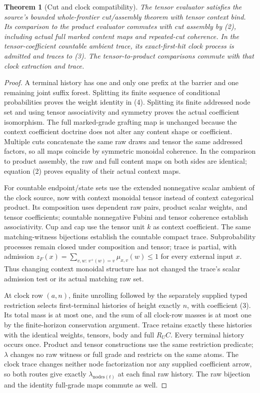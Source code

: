 \documentclass[11pt]{article}
\newtheorem{theorem}{Theorem}\newtheorem{proposition}[theorem]{Proposition}
\begin{document}
\begin{theorem}[Cut and clock compatibility]
The tensor evaluator satisfies the source's bounded whole-frontier cut/assembly theorem with tensor context bind. Its comparison to the product evaluator commutes with cut assembly by (2), including actual full marked content maps and repeated-cut coherence. In the tensor-coefficient countable ambient trace, its exact-first-hit clock process is admitted and traces to (3). The tensor-to-product comparisons commute with that clock extraction and trace.
\end{theorem}
\begin{proof}
A terminal history has one and only one prefix at the barrier and one remaining joint suffix forest. Splitting its finite sequence of conditional probabilities proves the weight identity in (4). Splitting its finite addressed node set and using tensor associativity and symmetry proves the actual coefficient isomorphism. The full marked-grade grafting map is unchanged because the context coefficient doctrine does not alter any content shape or coefficient. Multiple cuts concatenate the same raw draws and tensor the same addressed factors, so all maps coincide by symmetric monoidal coherence. In the comparison to product assembly, the raw and full content maps on both sides are identical; equation (2) proves equality of their actual context maps.

For countable endpoint/state sets use the extended nonnegative scalar ambient of the clock source, now with context monoidal tensor instead of context categorical product. Its composition uses dependent raw pairs, product scalar weights, and tensor coefficients; countable nonnegative Fubini and tensor coherence establish associativity. Cup and cap use the tensor unit $k$ as context coefficient. The same matching-witness bijections establish the countable compact trace. Subprobability processes remain closed under composition and tensor; trace is partial, with admission $z_F(x)=\sum_{v,w:\,v^+(w)=v}\mu_{x,v}(w)\leq1$ for every external input $x$. Thus changing context monoidal structure has not changed the trace's scalar admission test or its actual matching raw set.

At clock row $(a,n)$, finite unrolling followed by the separately supplied typed restriction selects first-terminal histories of height exactly $n$, with coefficient (3). Its total mass is at most one, and the sum of all clock-row masses is at most one by the finite-horizon conservation argument. Trace retains exactly these histories with the identical weights, tensors, body and full $R_UC$. Every terminal history occurs once. Product and tensor constructions use the same restriction predicate; $\lambda$ changes no raw witness or full grade and restricts on the same atoms. The clock trace changes neither node factorization nor any supplied coefficient arrow, so both routes give exactly $\lambda_{\mathrm{nodes}(t)}$ at each final raw history. The raw bijection and the identity full-grade maps commute as well.
\end{proof}
\end{document}
